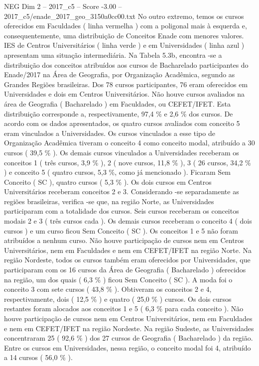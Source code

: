 \begin{textsample}{NEG Dim 2 – 2017\_c5 – Score -3.00 – 2017\_c5/enade\_2017\_geo\_3150a0cc00.txt}
No outro extremo, temos os cursos oferecidos em Faculdades ( linha vermelha ) com a poligonal mais à esquerda e, consequentemente, uma distribuição de Conceitos Enade com menores valores.
IES de Centros Universitários ( linha verde ) e em Universidades ( linha azul ) apresentam uma situação intermediária.
Na Tabela 5.3b, encontra -se a distribuição dos conceitos atribuídos aos cursos de Bacharelado participantes do Enade/2017 na Área de Geografia, por Organização Acadêmica, segundo as Grandes Regiões brasileiras.
Dos 78 cursos participantes, 76 eram oferecidos em Universidades e dois em Centros Universitários.
Não houve cursos avaliados na área de Geografia ( Bacharelado ) em Faculdades, ou CEFET/IFET.
Esta distribuição corresponde a, respectivamente, 97,4 \% e 2,6 \% dos cursos.
De acordo com os dados apresentados, os quatro cursos avaliados com conceito 5 eram vinculados a Universidades.
Os cursos vinculados a esse tipo de Organização Acadêmica tiveram o conceito 4 como conceito modal, atribuído a 30 cursos ( 39,5 \% ).
Os demais cursos vinculados a Universidades receberam os conceitos 1 ( três cursos, 3,9 \% ), 2 ( nove cursos, 11,8 \% ), 3 ( 26 cursos, 34,2 \% ) e conceito 5 ( quatro cursos, 5,3 \%, como já mencionado ).
Ficaram Sem Conceito ( SC ), quatro cursos ( 5,3 \% ).
Os dois cursos em Centros Universitários receberam conceitos 2 e 3.
Considerando -se separadamente as regiões brasileiras, verifica -se que, na região Norte, as Universidades participaram com a totalidade dos cursos.
Seis cursos receberam os conceitos modais 2 e 3 ( três cursos cada ).
Os demais cursos receberam o conceito 4 ( dois cursos ) e um curso ficou Sem Conceito ( SC ).
Os conceitos 1 e 5 não foram atribuídos a nenhum curso.
Não houve participação de cursos nem em Centros Universitários, nem em Faculdades e nem em CEFET/IFET na região Norte.
Na região Nordeste, todos os cursos também eram oferecidos por Universidades, que participaram com os 16 cursos da Área de Geografia ( Bacharelado ) oferecidos na região, um dos quais ( 6,3 \% ) ficou Sem Conceito ( SC ).
A moda foi o conceito 3 com sete cursos ( 43,8 \% ).
Obtiveram os conceitos 2 e 4, respectivamente, dois ( 12,5 \% ) e quatro ( 25,0 \% ) cursos.
Os dois cursos restantes foram alocados aos conceitos 1 e 5 ( 6,3 \% para cada conceito ).
Não houve participação de cursos nem em Centros Universitários, nem em Faculdades e nem em CEFET/IFET na região Nordeste.
Na região Sudeste, as Universidades concentraram 25 ( 92,6 \% ) dos 27 cursos de Geografia ( Bacharelado ) da região.
Entre os cursos em Universidades, nessa região, o conceito modal foi 4, atribuído a 14 cursos ( 56,0 \% ).

\end{textsample}
